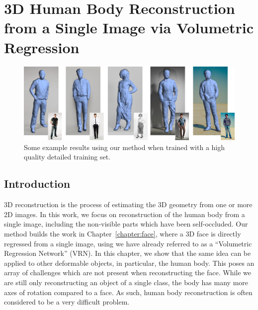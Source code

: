 \graphicspath{{chapter_humans/}}
\chapter{3D Human Body Reconstruction from a Single Image via
  Volumetric Regression}
\label{chapter:human}



\begin{figure}[h!]
  \centering
  \includegraphics[width=\linewidth]{img/demo.png}
  \caption[Example reconstructions]{Some example results using our
    method when trained with a high quality detailed training set.}
  \label{fig:topdemo}
\end{figure}


\section{Introduction}


3D reconstruction is the process of estimating the 3D geometry from
one or more 2D images. In this work, we focus on reconstruction of the
human body from a single image, including the non-visible parts which
have been self-occluded. Our method builds the work in
Chapter~\ref{chapter:face}, where a 3D face is directly regressed from
a single image, using we have already referred to as a ``Volumetric
Regression Network'' (VRN). In this chapter, we show that the same
idea can be applied to other deformable objects, in particular, the
human body. This poses an array of challenges which are not present
when reconstructing the face. While we are still only reconstructing
an object of a single class, the body has many more axes of rotation
compared to a face. As such, human body reconstruction is often
considered to be a very difficult problem.

